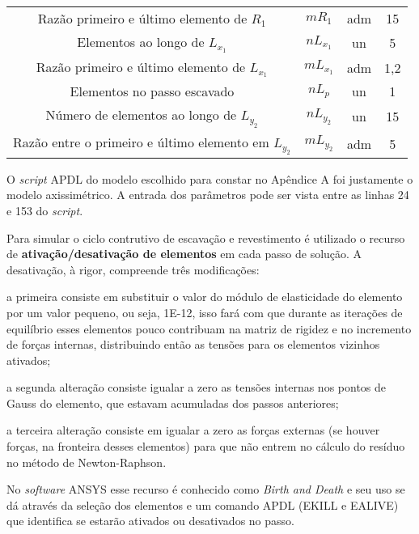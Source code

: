 \begin{table}[H]
\begin{tabular}{c c c c}
		Razão primeiro e último elemento de $R_1$ & $mR_{1}$ & adm & 15 \\	
		Elementos ao longo de $L_{x_1}$ & $nL_{x_1}$ & un & 5 \\
		Razão primeiro e último elemento de $L_{x_1}$ & $mL_{x_1}$ & adm & 1,2 \\				
		Elementos no passo escavado & $nL_{p}$ & un & 1 \\	
		Número de elementos ao longo de $L_{y_2}$ & $nL_{y_2}$ & un & 15 \\			
		Razão entre o primeiro e último elemento em $L_{y_2}$ & $mL_{y_2}$ & adm & 5 \\				
		\hline
	\end{tabular}
	\normalsize
\end{table}

O \textit{script} APDL do modelo escolhido para constar no Apêndice A foi justamente o modelo axissimétrico. A entrada dos parâmetros pode ser vista entre as linhas 24 e 153 do \textit{script}.

Para simular o ciclo contrutivo de escavação e revestimento é utilizado o recurso de \textbf{ativação/desativação de elementos} em cada passo de solução. A desativação, à rigor, compreende três modificações:
\begin{alineas}
	
	\item a primeira consiste em substituir o valor do módulo de elasticidade do elemento por um valor pequeno, ou seja, 1E-12, isso fará com que durante as iterações de equilíbrio esses elementos pouco contribuam na matriz de rigidez e no incremento de forças internas, distribuindo então as tensões para os elementos vizinhos ativados;
	
	\item a segunda alteração consiste igualar a zero as tensões internas nos pontos de Gauss do elemento, que estavam acumuladas dos passos anteriores; 
	
	\item a terceira alteração consiste em igualar a zero as forças externas (se houver forças, na fronteira desses elementos) para que não entrem no cálculo do resíduo no método de Newton-Raphson.
	
\end{alineas}

No \textit{software} ANSYS esse recurso é conhecido como \textit{Birth and Death} e seu uso se dá através da seleção dos elementos e um comando APDL (EKILL e EALIVE) que identifica se estarão ativados ou desativados no passo.

